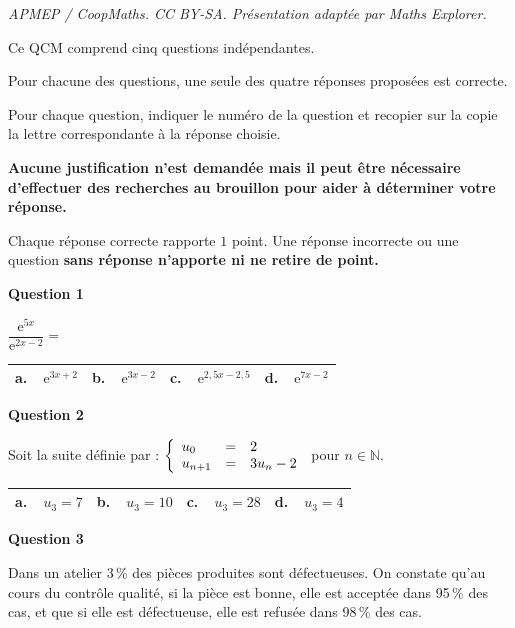 \documentclass[10pt]{article}
\providecommand{\N}{\mathbb{N}}
\begin{document}
\noindent\textit{APMEP / CoopMaths. CC BY-SA. Présentation adaptée par Maths Explorer.}\par\medskip
\medskip

Ce QCM comprend cinq questions indépendantes.

Pour chacune des questions, une seule des quatre réponses proposées est correcte.

Pour chaque question, indiquer le numéro de la question et recopier sur la copie la lettre correspondante à la réponse choisie.

\textbf{Aucune justification n'est demandée mais il peut être nécessaire d'effectuer des recherches au brouillon pour aider à déterminer votre réponse.}

Chaque réponse correcte rapporte $1$ point. Une réponse incorrecte ou une question \textbf{sans réponse n'apporte ni ne retire de point.}

\medskip

\textbf{Question 1}

$\dfrac{\text{e}^{5x}}{\text{e}^{2x - 2}} = $

\begin{center}
\begin{tabularx}{\linewidth}{|*{4}{X|}}\hline
\textbf{a.~~}$\text{e}^{3x + 2}$&\textbf{b.~~}$\text{e}^{3x - 2}$&\textbf{c.~~}$\text{e}^{2,5x - 2,5}$&\textbf{d.~~}$\text{e}^{7x - 2}$\\ \hline
\end{tabularx}
\end{center}

\medskip

\textbf{Question 2}

Soit la suite définie par : $\left\{\begin{array}{l c l}
u_0&=&2\\u_{n+1} &=& 3u_n - 2
\end{array}\right.$ pour $n \in \N$.

\begin{center}
\begin{tabularx}{\linewidth}{|*{4}{X|}}\hline
\textbf{a.~~}$u_3 = 7$&\textbf{b.~~}$u_3 = 10$&\textbf{c.~~}$u_3 = 28$&\textbf{d.~~}$u_3 = 4$\\ \hline
\end{tabularx}
\end{center}
 
\medskip

\textbf{Question 3}

Dans un atelier 3\,\% des pièces produites sont défectueuses. On constate qu'au cours du
contrôle qualité, si la pièce est bonne, elle est acceptée dans 95\,\% des cas, et que si elle est défectueuse, elle est refusée dans 98\,\% des cas.
\end{document}
